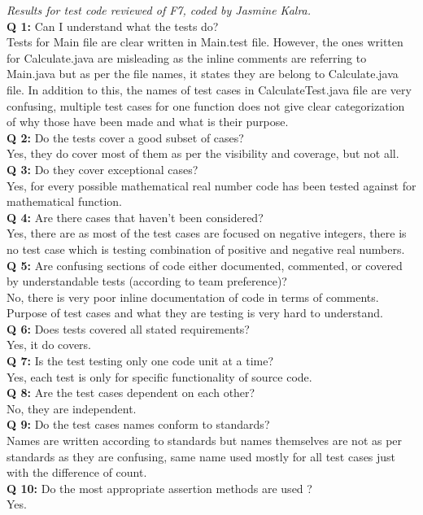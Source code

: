 \documentclass[10pt]{article}
\begin{document}
 \newpage
 \textit{Results for test code reviewed of F7, coded by Jasmine Kalra.}\\
 \newline
\textbf{Q 1:} Can I understand what the tests do?\\
Tests for Main file are clear written in Main.test file. However, the ones written for Calculate.java are misleading as the inline comments are referring to Main.java but as per the file names, it states they are belong to Calculate.java file. In addition to this, the names of test cases in CalculateTest.java file are very confusing, multiple test cases for one function does not give clear categorization of why those have been made and what is their purpose.\\
\newline
\textbf{Q 2:} Do the tests cover a good subset of cases? \\
 Yes, they do cover most of them as per the visibility and coverage, but not all.\\
 \newline
\textbf{Q 3:} Do they cover exceptional cases?\\
 Yes, for every possible mathematical real number code has been tested against for mathematical function.\\
 \newline
\textbf{Q 4:} Are there cases that haven’t been considered?\\
 Yes, there are as most of the test cases are focused on negative integers, there is no test case which is testing combination of positive and negative real numbers.\\
 \newline
\textbf{Q 5:} Are confusing sections of code either documented, commented, or covered by understandable tests (according to team preference)?\\
 No, there is very poor inline documentation of code in terms of comments. Purpose of test cases and what they are testing is very hard to understand.\\
 \newline
\textbf{Q 6:} Does tests covered all stated requirements?\\
 Yes, it do covers.\\
 \newline
\textbf{Q 7:} Is the test testing only one code unit at a time? \\
 Yes, each test is only for specific functionality of source code.\\
 \newline
\textbf{Q 8:} Are the test cases dependent on each other?\\
No, they are independent.\\
\newline
\textbf{Q 9:} Do the test cases names conform to standards?\\
Names are written according to standards but names themselves are not as per standards as they are confusing, same name used mostly for all test cases just with the difference of count.\\
\newline
\textbf{Q 10:} Do the most appropriate assertion methods are used ?\\
Yes.
 
\end{document}
